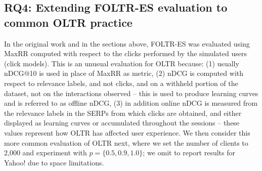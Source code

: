 
%
%


\subsection{RQ4: Extending FOLTR-ES evaluation to common OLTR practice}

In the original work and in the sections above, FOLTR-ES was evaluated using MaxRR computed with respect to the clicks performed by the simulated users (click models). This is an unusual evaluation for OLTR because: (1) usually nDCG@10 is used in place of MaxRR as metric, (2) nDCG is computed with respect to relevance labels, and not clicks, and on a withheld portion of the dataset, not on the interactions observed -- this is used to produce learning curves and is referred to as offline nDCG, (3) in addition online nDCG is measured from the relevance labels in the SERPs from which clicks are obtained, and either displayed as learning curves or accumulated throughout the sessions -- these values represent how OLTR has affected user experience. We then consider this more common evaluation of OLTR next, where we set the number of clients to 2,000 and experiment with $p=\{0.5, 0.9, 1.0\}$; we omit to report results for Yahoo! due to space limitations. 


